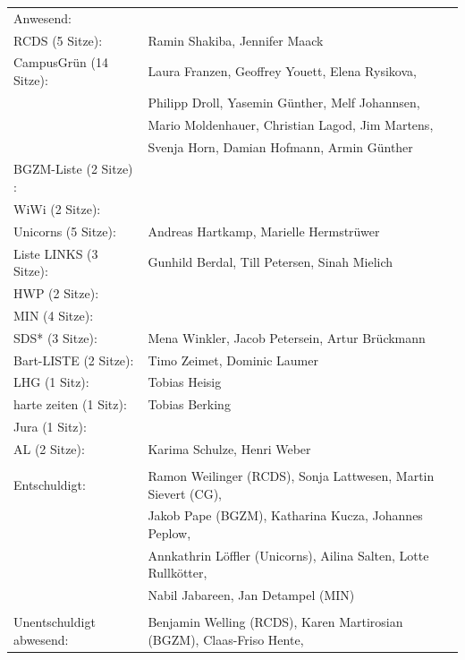 \documentclass[ngerman,headheight=70pt]{scrartcl}
\begin{document}
    \begin{tabular}{ll}
        Anwesend: & \\
            RCDS (5 Sitze): & Ramin Shakiba, Jennifer Maack \\
             CampusGrün (14 Sitze): & Laura Franzen, Geoffrey Youett, Elena Rysikova, \\
                                   & Philipp Droll, Yasemin Günther, Melf Johannsen, \\
                                   & Mario Moldenhauer, Christian Lagod, Jim Martens, \\
                                   & Svenja Horn, Damian Hofmann, Armin Günther \\
             BGZM-Liste (2 Sitze) : & \\
             WiWi (2 Sitze): & \\
             Unicorns (5 Sitze): & Andreas Hartkamp, Marielle Hermstrüwer \\
             Liste LINKS (3 Sitze): & Gunhild Berdal, Till Petersen, Sinah Mielich \\
             HWP (2 Sitze): &  \\
             MIN (4 Sitze): &  \\
             SDS* (3 Sitze): & Mena Winkler, Jacob Petersein, Artur Brückmann \\
             Bart-LISTE (2 Sitze): & Timo Zeimet, Dominic Laumer \\
             LHG (1 Sitz): & Tobias Heisig \\
             harte zeiten (1 Sitz): & Tobias Berking \\
             Jura (1 Sitz): & \\
             AL (2 Sitze): & Karima Schulze, Henri Weber \\
            & \\
        Entschuldigt: & Ramon Weilinger (RCDS), Sonja Lattwesen, Martin Sievert (CG), \\
                      & Jakob Pape (BGZM), Katharina Kucza, Johannes Peplow, \\
                      & Annkathrin Löffler (Unicorns), Ailina Salten, Lotte Rullkötter, \\
                      & Nabil Jabareen, Jan Detampel (MIN) \\
                      &\\
        Unentschuldigt abwesend: & Benjamin Welling (RCDS), Karen Martirosian (BGZM), Claas-Friso Hente,\\

\end{tabular}
\end{document}

